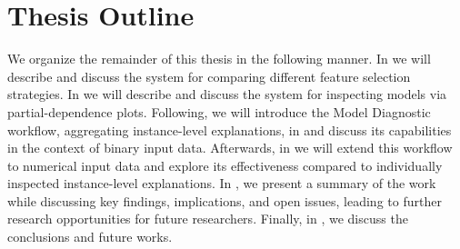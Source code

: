 \section{Thesis Outline}
\label{sec:thesisoutline}
We organize the remainder of this thesis in the following manner.
In  we will describe and discuss the \infuse system for comparing different feature selection strategies.
In  we will describe and discuss the \prospector system for inspecting models via partial-dependence plots.
Following, we will introduce the Model Diagnostic workflow, aggregating instance-level explanations, in  and discuss its capabilities in the context of binary input data.
Afterwards, in  we will extend this workflow to numerical input data and explore its effectiveness compared to individually inspected instance-level explanations.
In , we present a summary of the work while discussing key findings, implications, and open issues, leading to further research opportunities for future researchers.
Finally, in , we discuss the conclusions and future works.